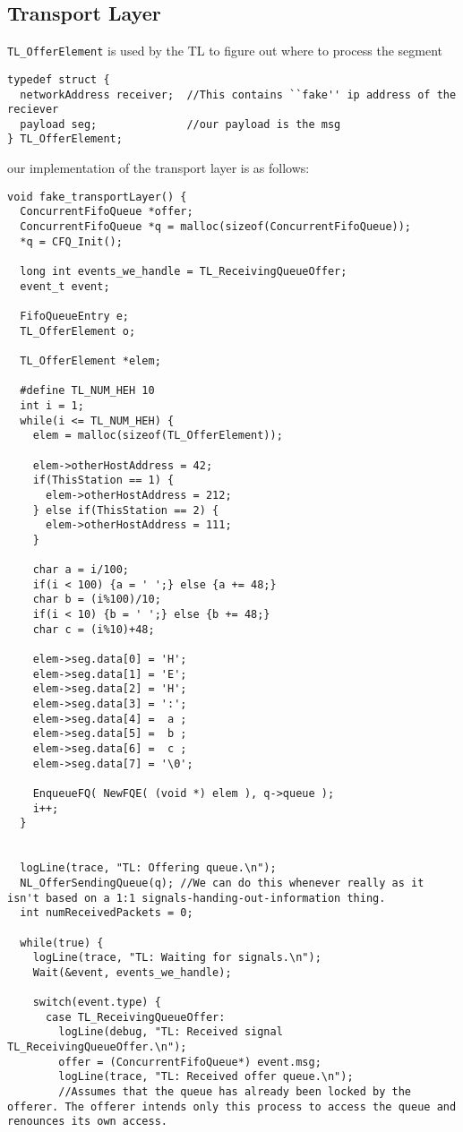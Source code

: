 \subsection{Transport Layer}

\texttt{TL\_OfferElement} is used by the TL to figure out where to process the segment
\begin{lstlisting}
typedef struct {
  networkAddress receiver;  //This contains ``fake'' ip address of the reciever
  payload seg;              //our payload is the msg
} TL_OfferElement;
\end{lstlisting}
\break

our implementation of the transport layer is as follows:

\begin{lstlisting}
void fake_transportLayer() {
  ConcurrentFifoQueue *offer;
  ConcurrentFifoQueue *q = malloc(sizeof(ConcurrentFifoQueue));
  *q = CFQ_Init();

  long int events_we_handle = TL_ReceivingQueueOffer;
  event_t event;

  FifoQueueEntry e;
  TL_OfferElement o;

  TL_OfferElement *elem;

  #define TL_NUM_HEH 10
  int i = 1;
  while(i <= TL_NUM_HEH) {
    elem = malloc(sizeof(TL_OfferElement));

    elem->otherHostAddress = 42;
    if(ThisStation == 1) {
      elem->otherHostAddress = 212;
    } else if(ThisStation == 2) {
      elem->otherHostAddress = 111;
    }

    char a = i/100;
    if(i < 100) {a = ' ';} else {a += 48;}
    char b = (i%100)/10;
    if(i < 10) {b = ' ';} else {b += 48;}
    char c = (i%10)+48;

    elem->seg.data[0] = 'H';
    elem->seg.data[1] = 'E';
    elem->seg.data[2] = 'H';
    elem->seg.data[3] = ':';
    elem->seg.data[4] =  a ;
    elem->seg.data[5] =  b ;
    elem->seg.data[6] =  c ;
    elem->seg.data[7] = '\0';

    EnqueueFQ( NewFQE( (void *) elem ), q->queue );
    i++;
  }


  logLine(trace, "TL: Offering queue.\n");
  NL_OfferSendingQueue(q); //We can do this whenever really as it isn't based on a 1:1 signals-handing-out-information thing.
  int numReceivedPackets = 0;

  while(true) {
    logLine(trace, "TL: Waiting for signals.\n");
    Wait(&event, events_we_handle);

    switch(event.type) {
      case TL_ReceivingQueueOffer:
        logLine(debug, "TL: Received signal TL_ReceivingQueueOffer.\n");
        offer = (ConcurrentFifoQueue*) event.msg;
        logLine(trace, "TL: Received offer queue.\n");
        //Assumes that the queue has already been locked by the offerer. The offerer intends only this process to access the queue and renounces its own access.


\end{lstlisting}
